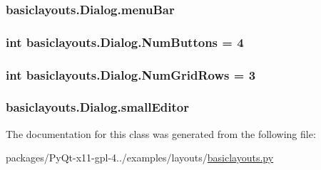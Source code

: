 \subsubsection[{menu\+Bar}]{\setlength{\rightskip}{0pt plus 5cm}basiclayouts.\+Dialog.\+menu\+Bar}\label{classbasiclayouts_1_1Dialog_a4d1ef7d8afd68a21c8eab6c9790191eb}
\hypertarget{classbasiclayouts_1_1Dialog_abea82ba2d537b63c3c59516be738617d}{}
\subsubsection[{Num\+Buttons}]{\setlength{\rightskip}{0pt plus 5cm}int basiclayouts.\+Dialog.\+Num\+Buttons = 4\hspace{0.3cm}{\ttfamily [static]}}\label{classbasiclayouts_1_1Dialog_abea82ba2d537b63c3c59516be738617d}
\hypertarget{classbasiclayouts_1_1Dialog_a48cda495e98fe2e0f0a7e8be75455256}{}
\subsubsection[{Num\+Grid\+Rows}]{\setlength{\rightskip}{0pt plus 5cm}int basiclayouts.\+Dialog.\+Num\+Grid\+Rows = 3\hspace{0.3cm}{\ttfamily [static]}}\label{classbasiclayouts_1_1Dialog_a48cda495e98fe2e0f0a7e8be75455256}
\hypertarget{classbasiclayouts_1_1Dialog_a308137f8192349a6c72d27ac34ee8c83}{}
\subsubsection[{small\+Editor}]{\setlength{\rightskip}{0pt plus 5cm}basiclayouts.\+Dialog.\+small\+Editor}\label{classbasiclayouts_1_1Dialog_a308137f8192349a6c72d27ac34ee8c83}


The documentation for this class was generated from the following file\+:\begin{DoxyCompactItemize}
\item 
packages/\+Py\+Qt-\/x11-\/gpl-\/4../examples/layouts/\hyperlink{basiclayouts_8py}{basiclayouts.\+py}\end{DoxyCompactItemize}

